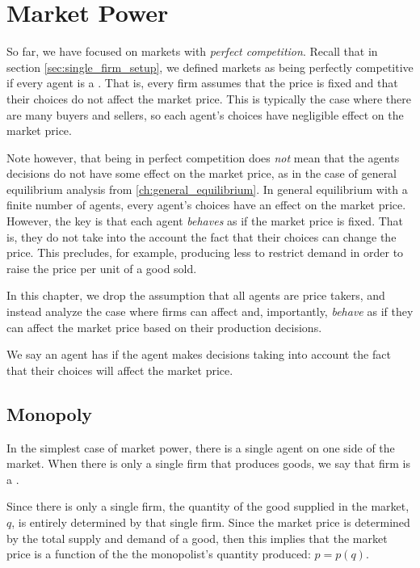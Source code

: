 \chapter{Market Power}
So far, we have focused on markets with \emph{perfect competition}. Recall that in section \ref{sec:single_firm_setup}, we defined markets as being perfectly competitive if every agent is a . That is, every firm assumes that the price is fixed and that their choices do not affect the market price. This is typically the case where there are many buyers and sellers, so each agent's choices have negligible effect on the market price. 

Note however, that being in perfect competition does \emph{not} mean that the agents decisions do not have some effect on the market price, as in the case of general equilibrium analysis from \ref{ch:general_equilibrium}. In general equilibrium with a finite number of agents, every agent's choices have an effect on the market price. However, the key is that each agent \emph{behaves} as if the market price is fixed. That is, they do not take into the account the fact that their choices can change the price. This precludes, for example, producing less to restrict demand in order to raise the price per unit of a good sold. 

In this chapter, we drop the assumption that all agents are price takers, and instead analyze the case where firms can affect and, importantly, \emph{behave} as if they can affect the market price based on their production decisions. 

\begin{definition*}
    We say an agent has  if the agent makes decisions taking into account the fact that their choices will affect the market price. 
\end{definition*}

\section{Monopoly}
In the simplest case of market power, there is a single agent on one side of the market. When there is only a single firm that produces goods, we say that firm is a . 

Since there is only a single firm, the quantity of the good supplied in the market, $q$, is entirely determined by that single firm. Since the market price is determined by the total supply and demand of a good, then this implies that the market price is a function of the the monopolist's quantity produced: $p = p(q)$. 

